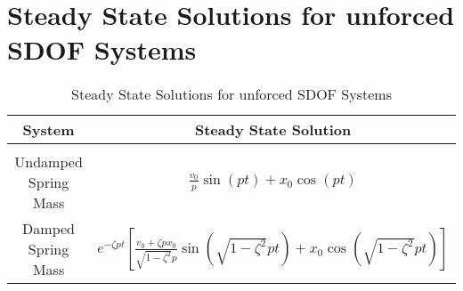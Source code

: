 \section{Steady State Solutions for unforced SDOF Systems}
\begin{table}[h]
    \centering
    \caption{Steady State Solutions for unforced SDOF Systems}
    \begin{tabular}{cc}
        \toprule
        System & Steady State Solution \\
        \hline \\[-1ex]
        Undamped Spring Mass & \(\displaystyle \frac{v_0}{p}\sin(pt) + x_0\cos(pt)\) \\[3ex]
        Damped Spring Mass & \(\displaystyle e^{-\zeta pt}\left[\frac{v_0 + \zeta p x_0}{\sqrt{1 - \zeta^2}p}\sin(\sqrt{1 - \zeta^2}p t) + x_0 \cos(\sqrt{1 - \zeta^2} pt)\right]\) 
    \end{tabular}
\end{table} 

